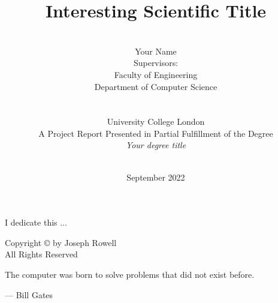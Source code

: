 \documentclass[12pt, a4paper]{report}
\date{September 2022}
\title{Interesting Scientific Title}
\author{\\ \Large{Your Name}
\\ Supervisors: 
\\ Faculty of Engineering
\\ Department of Computer Science
\\ 
\\
\\ University College London
\\
A Project Report Presented in Partial Fulfillment of the Degree \\ \textit{Your degree title}
\\ \\
}
\begin{document}
      

\thispagestyle{headings}
\maketitle
\FloatBarrier
{}

\thispagestyle{empty}
\begin{abstract}


\end{abstract}
\newpage
\thispagestyle{empty}
\begin{center}
I dedicate this ...
\end{center}

\newpage
\thispagestyle{empty}
\vspace*{\fill}
\begin{center}
Copyright \copyright  {} by Joseph Rowell \\ All Rights Reserved
\end{center}
\vspace*{\fill}
\newpage
\thispagestyle{empty}
\epigraph{The computer was born to solve problems that did not exist before.}{--- \textup{Bill Gates}}
\end{document}
